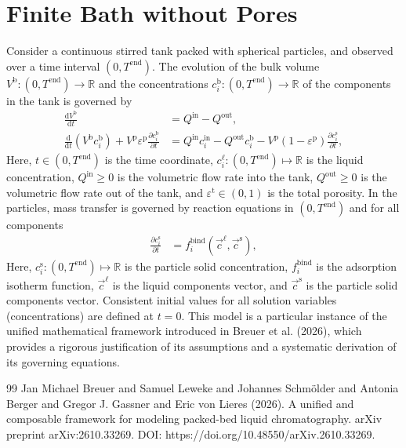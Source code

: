 \documentclass{article}
\begin{document}
\section*{Finite Bath without Pores}
Consider a continuous stirred tank packed with spherical particles, and observed over a time interval $(0, T^{\mathrm{end}})$.
The evolution of the bulk volume $V^{\mathrm{b}}\colon (0, T^{\mathrm{end}}) \to \mathbb{R}$ and the concentrations $c^{\mathrm{b}}_{i}\colon (0, T^{\mathrm{end}}) \to \mathbb{R}$ of the components in the tank is governed by
\begin{align}
    \frac{\mathrm{d}V^{\mathrm{b}}}{\mathrm{d}t}
    &= Q^{\mathrm{in}}
        - Q^{\mathrm{out}},
    \\
    \frac{\mathrm{d}}{\mathrm{d} t} \left( V^{\mathrm{b}} c^{\mathrm{b}}_{i} \right)
        + V^{\mathrm{p}} \varepsilon^{\mathrm{p}} \frac{\partial c^{\mathrm{b}}_{i}}{\partial t}
    &= Q^{\mathrm{in}} c^{\mathrm{in}}_{i}
        - Q^{\mathrm{out}} c^{\mathrm{b}}_{i}
        - V^{\mathrm{p}} \left( 1 - \varepsilon^{\mathrm{p}} \right) \frac{\partial c^{\mathrm{s}}_{i}}{\partial t},
\end{align}
Here, $t\in (0, T^{\mathrm{end}})$ is the time coordinate, $c^{\mathrm{\ell}}_{i}\colon (0, T^{\mathrm{end}}) \mapsto \mathbb{R}$ is the liquid concentration, $Q^{\mathrm{in}}\geq 0$ is the volumetric flow rate into the tank, $Q^{\mathrm{out}}\geq 0$ is the volumetric flow rate out of the tank, and $\varepsilon^{\mathrm{t}}\in (0, 1)$ is the total porosity.
In the particles, mass transfer is governed by reaction equations in $(0, T^{\mathrm{end}})$ and for all components
\begin{align}
    \frac{\partial c^{\mathrm{s}}_{i}}{\partial t}
    &= f^{\mathrm{bind}}_{i}\left( \vec{c}^{\mathrm{\ell}}, \vec{c}^{\mathrm{s}} \right),
\end{align}
Here, $c^{\mathrm{s}}_{i}\colon (0, T^{\mathrm{end}}) \mapsto \mathbb{R}$ is the particle solid concentration, $f^{\mathrm{bind}}_{i}$ is the adsorption isotherm function, $\vec{c}^{\mathrm{\ell}}$ is the liquid components vector, and $\vec{c}^{\mathrm{s}}$ is the particle solid components vector.
Consistent initial values for all solution variables (concentrations) are defined at $t = 0$.
This model is a particular instance of the unified mathematical framework introduced in Breuer et al. (2026), which provides a rigorous justification of its assumptions and a systematic derivation of its governing equations.
\begin{thebibliography}{99}
     Jan Michael Breuer and Samuel Leweke and Johannes Schmölder and Antonia Berger and Gregor J. Gassner and Eric von Lieres (2026). A unified and composable framework for modeling packed-bed liquid chromatography. arXiv preprint arXiv:2610.33269. DOI: https://doi.org/10.48550/arXiv.2610.33269.
\end{thebibliography}
\end{document}

